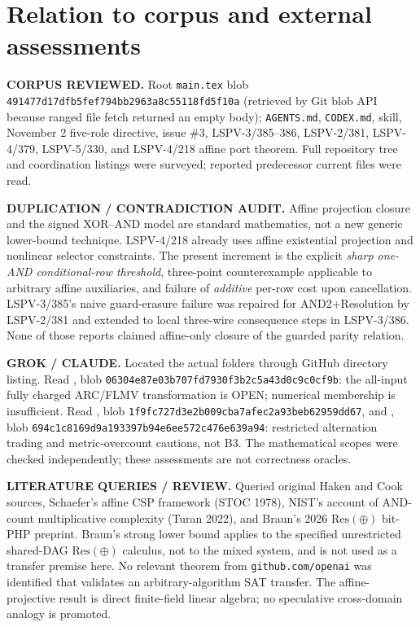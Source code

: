\documentclass[11pt]{article}
\begin{document}
\section*{Relation to corpus and external assessments}
\noindent\textbf{CORPUS REVIEWED.} Root \texttt{main.tex} blob \texttt{491477d17dfb5fef794bb2963a8c55118fd5f10a} (retrieved by Git blob API because ranged file fetch returned an empty body); \texttt{AGENTS.md}, \texttt{CODEX.md}, skill, November 2 five-role directive, issue \#3, LSPV-3/385--386, LSPV-2/381, LSPV-4/379, LSPV-5/330, and LSPV-4/218 affine port theorem. Full repository tree and coordination listings were surveyed; reported predecessor current files were read.

\noindent\textbf{DUPLICATION / CONTRADICTION AUDIT.} Affine projection closure and the signed XOR--AND model are standard mathematics, not a new generic lower-bound technique. LSPV-4/218 already uses affine existential projection and nonlinear selector constraints. The present increment is the explicit \emph{sharp one-AND conditional-row threshold}, three-point counterexample applicable to arbitrary affine auxiliaries, and failure of \emph{additive} per-row cost upon cancellation. LSPV-3/385's naive guard-erasure failure was repaired for AND2+Resolution by LSPV-2/381 and extended to local three-wire consequence steps in LSPV-3/386. None of those reports claimed affine-only closure of the guarded parity relation.

\noindent\textbf{GROK / CLAUDE.} Located the actual folders through GitHub directory listing. Read , blob \texttt{06304e87e03b707fd7930f3b2c5a43d0c9c0cf9b}: the all-input fully charged ARC/FLMV transformation is OPEN; numerical membership is insufficient. Read , blob \texttt{1f9fc727d3e2b009cba7afec2a93beb62959dd67}, and , blob \texttt{694c1c8169d9a193397b94e6ee572c476e639a94}: restricted alternation trading and metric-overcount cautions, not B3. The mathematical scopes were checked independently; these assessments are not correctness oracles.

\noindent\textbf{LITERATURE QUERIES / REVIEW.} Queried original Haken and Cook sources, Schaefer's affine CSP framework (STOC 1978), NIST's account of AND-count multiplicative complexity (Turan 2022), and Braun's 2026 $\mathrm{Res}(\oplus)$ bit-PHP preprint. Braun's strong lower bound applies to the specified unrestricted shared-DAG \emph{$\mathrm{Res}(\oplus)$} calculus, not to the mixed system, and is not used as a transfer premise here. No relevant theorem from \texttt{github.com/openai} was identified that validates an arbitrary-algorithm SAT transfer. The affine-projective result is direct finite-field linear algebra; no speculative cross-domain analogy is promoted.
\end{document}
